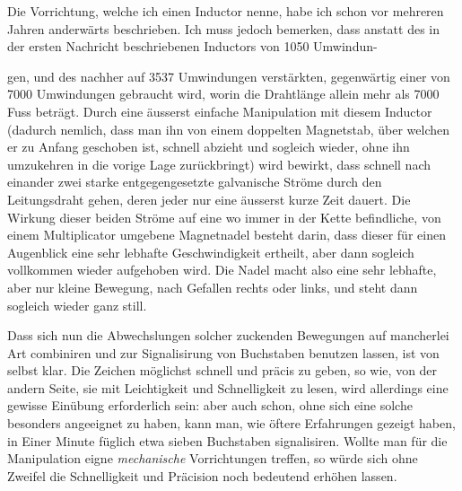 Die Vorrichtung, welche ich einen Inductor nenne, habe ich schon vor mehreren Jahren anderwärts beschrieben{\renewcommand{\thefootnote}{**)}}. Ich muss jedoch bemerken, dass anstatt des in der ersten Nachricht beschriebenen Inductors von 1050 Umwindun-
\par\clearpage
{}
\noindent gen, und des nachher auf 3537 Umwindungen verstärkten, gegenwärtig einer von 7000 Umwindungen gebraucht wird, worin die Drahtlänge allein mehr als 7000 Fuss beträgt. Durch eine äusserst einfache Manipulation mit diesem Inductor (dadurch nemlich, dass man ihn von einem doppelten Magnetstab, über welchen er zu Anfang geschoben ist, schnell abzieht und sogleich wieder, ohne ihn umzukehren in die vorige Lage zurückbringt) wird bewirkt, dass schnell nach einander zwei starke entgegengesetzte galvanische Ströme durch den Leitungsdraht gehen, deren jeder nur eine äusserst kurze Zeit dauert. Die Wirkung dieser beiden Ströme auf eine wo immer in der Kette befindliche, von einem Multiplicator umgebene Magnetnadel besteht darin, dass dieser für einen Augenblick eine sehr lebhafte Geschwindigkeit ertheilt, aber dann sogleich vollkommen wieder aufgehoben wird. Die Nadel macht also eine sehr lebhafte, aber nur kleine Bewegung, nach Gefallen rechts oder links, und steht dann sogleich wieder ganz still.

Dass sich nun die Abwechslungen solcher zuckenden Bewegungen auf mancherlei Art combiniren und zur Signalisirung von Buchstaben benutzen lassen, ist von selbst klar. Die Zeichen möglichst schnell und präcis zu geben, so wie, von der andern Seite, sie mit Leichtigkeit und Schnelligkeit zu lesen, wird allerdings eine gewisse Einübung erforderlich sein: aber auch schon, ohne sich eine solche besonders angeeignet zu haben, kann man, wie öftere Erfahrungen gezeigt haben, in Einer Minute füglich etwa sieben Buchstaben signalisiren. Wollte man für die Manipulation eigne \textit{mechanische} Vorrichtungen treffen, so würde sich ohne Zweifel die Schnelligkeit und Präcision noch bedeutend erhöhen lassen.

